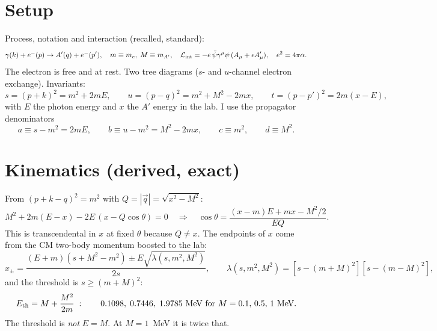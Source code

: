 \documentclass[11pt,a4paper]{article}
\newcommand{\Ap}{A'}
\newcommand{\eps}{\epsilon}
\begin{document}
\section{Setup}
Process, notation and interaction (recalled, standard):
\begin{equation}
\gamma(k)+e^-(p)\to \Ap(q)+e^-(p'),\quad m\equiv m_e,\; M\equiv m_{\Ap},\quad
\mathcal L_{\rm int}=-e\,\bar\psi\gamma^\mu\psi\,(A_\mu+\eps A'_\mu),\quad e^2=4\pi\alpha .
\end{equation}
The electron is free and at rest. Two tree diagrams ($s$- and $u$-channel electron exchange). Invariants:
\begin{equation}
s=(p+k)^2=m^2+2mE,\qquad u=(p-q)^2=m^2+M^2-2mx,\qquad t=(p-p')^2=2m(x-E),
\end{equation}
with $E$ the photon energy and $x$ the $\Ap$ energy in the lab. I use the propagator denominators
\begin{equation}
a\equiv s-m^2=2mE,\qquad b\equiv u-m^2=M^2-2mx,\qquad c\equiv m^2,\qquad d\equiv M^2 .
\label{eq:abcd}
\end{equation}

\section{Kinematics (derived, exact)}
From $(p+k-q)^2=m^2$ with $Q=|\vec q|=\sqrt{x^2-M^2}$:
\begin{equation}
M^2+2m(E-x)-2E\,(x-Q\cos\theta)=0
\quad\Longrightarrow\quad
\cos\theta=\frac{(x-m)E+mx-M^2/2}{EQ}.
\label{eq:costheta}
\end{equation}
This is transcendental in $x$ at fixed $\theta$ because $Q\neq x$. The endpoints of $x$ come from the CM two-body
momentum boosted to the lab:
\begin{equation}
x_\pm=\frac{(E+m)(s+M^2-m^2)\pm E\sqrt{\lambda(s,m^2,M^2)}}{2s},\qquad
\lambda(s,m^2,M^2)=[s-(m+M)^2][s-(m-M)^2],
\label{eq:xpm}
\end{equation}
and the threshold is $s\ge (m+M)^2$:
\begin{equation}
E_{\rm th}=M+\frac{M^2}{2m}\;:\qquad 0.1098,\;0.7446,\;1.9785~\text{MeV for }M=0.1,\,0.5,\,1~\text{MeV}.
\label{eq:thr}
\end{equation}
The threshold is \emph{not} $E=M$. At $M=1$~MeV it is twice that.
\end{document}
